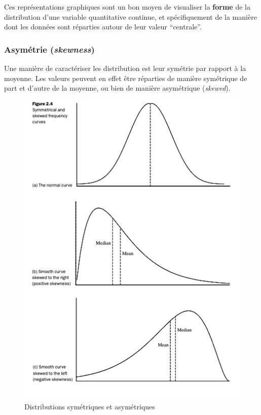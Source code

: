 \documentclass[
  french,
]{book}
\begin{document}
Ces représentations graphiques sont un bon moyen de visualiser la \textbf{forme} de la distribution d'une variable quantitative continue, et spécifiquement de la manière dont les données sont réparties autour de leur valeur ``centrale''.

\hypertarget{asymuxe9trie-skewness}{%
\subsubsection{\texorpdfstring{Asymétrie (\emph{skewness})}{Asymétrie (skewness)}}\label{asymuxe9trie-skewness}}

Une manière de caractériser les distribution est leur symétrie par rapport à la moyenne. Les valeurs peuvent en effet être réparties de manière symétrique de part et d'autre de la moyenne, ou bien de manière asymétrique (\emph{skewed}).

\begin{figure}
\centering
\includegraphics{images/skewed.png}
\caption{Distributions symétriques et asymétriques \citep[p.54]{feinstein2002}}
\end{figure}
\end{document}
